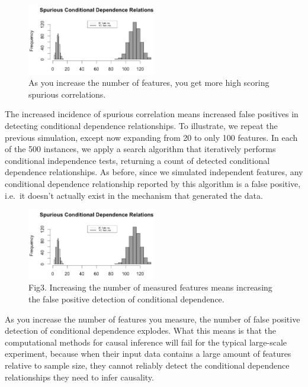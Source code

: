 \documentclass[journal=jacsat,manuscript=article]{achemso}
\begin{document}
\begin{figure}[!tpb]
\centerline{\includegraphics[width=0.5\textwidth]{figs/spurious_corr.png}}
\caption{As you increase the number of features, you get more high scoring
spurious correlations.}
\label{spur_corr}
\end{figure}

The increased incidence of spurious correlation means increased false
positives in detecting conditional dependence relationships. To
illustrate, we repeat the previous simulation, except now expanding from
20 to only 100 features. In each of the 500 instances, we apply a search
algorithm that iteratively performs conditional independence tests,
returning a count of detected conditional dependence relationships. As
before, since we simulated independent features, any conditional
dependence relationship reported by this algorithm is a false positive,
i.e.~it doesn't actually exist in the mechanism that generated the data.

\begin{figure}[!tpb]
\centerline{\includegraphics[width=0.5\textwidth]{figs/spurious_dep.png}}
\caption{Fig3. Increasing the number of measured features means increasing the
false positive detection of conditional dependence.}
\label{spur_dep}
\end{figure}

As you increase the number of features you measure, the number of false
positive detection of conditional dependence explodes. What this means
is that the computational methods for causal inference will fail for the
typical large-scale experiment, because when their input data contains a
large amount of features relative to sample size, they cannot reliably
detect the conditional dependence relationships they need to infer
causality.
\end{document}
